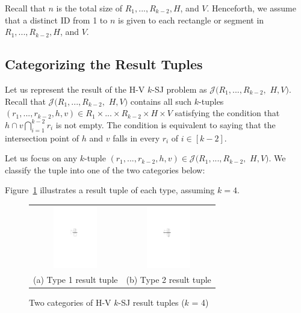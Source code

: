 \documentclass[sigconf]{acmart}
\def\vgap{\vspace{1mm}}
\def\figcapup{\vspace{-0mm}}
\def\figcapdown{\vspace{-0mm}}
\def\J{\mathcal{J}}
\begin{document}
Recall that $n$ is the total size of $R_1, ..., R_{k-2}, H$, and $V$. Henceforth, we assume that a distinct ID from 1 to $n$ is given to each rectangle or segment in $R_1, ..., R_{k-2}, H$, and $V$.

\subsection{Categorizing the Result Tuples} \label{sec:hv:result-part}

Let us represent the result of the H-V $k$-SJ problem as $\J(R_1, ..., R_{k-2},$ $H, V)$. Recall that $\J(R_1, ..., R_{k-2},$ $H, V)$ contains all such $k$-tuples $(r_1, ..., r_{k-2}, h, v) \in R_1 \times ... \times R_{k-2} \times H \times V$ satisfying the condition that $h \cap v \bigcap_{i=1}^{k-2} r_i$ is not empty. The condition is equivalent to saying that the intersection point of $h$ and $v$ falls in every $r_i$ of $i \in [k-2]$.

\vgap

Let us focus on any $k$-tuple $(r_1, ..., r_{k-2}, h, v) \in  \J(R_1, ..., R_{k-2},$ $H, V)$. We classify the tuple into one of the two categories below:

Figure~\ref{fig:hv:types} illustrates a result tuple of each type, assuming $k = 4$.

\begin{figure} 
    \begin{tabular}{cc} 
        \includegraphics[height=27mm]{./artwork/type1} & 
        \hspace{5mm} \includegraphics[height=27mm]{./artwork/type2} \\
        (a) Type 1 result tuple &
        (b) Type 2 result tuple
    \end{tabular}
    
    \figcapup 
    \caption{Two categories of H-V $k$-SJ result tuples ($k$ = 4)} 
    \label{fig:hv:types}
    \figcapdown
\end{figure}
\end{document}
